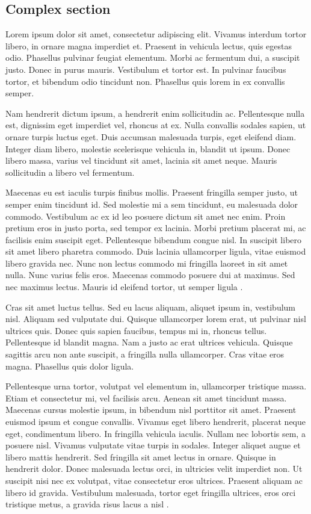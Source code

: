
\subsection{\label{ch:sec:complex-sec}Complex section}


Lorem ipsum dolor sit amet, consectetur adipiscing elit. Vivamus interdum tortor libero, in ornare magna imperdiet et. Praesent in vehicula lectus, quis egestas odio. Phasellus pulvinar feugiat elementum. Morbi ac fermentum dui, a suscipit justo. Donec in purus mauris. Vestibulum et tortor est. In pulvinar faucibus tortor, et bibendum odio tincidunt non. Phasellus quis lorem in ex convallis semper.

Nam hendrerit dictum ipsum, a hendrerit enim sollicitudin ac. Pellentesque nulla est, dignissim eget imperdiet vel, rhoncus at ex. Nulla convallis sodales sapien, ut ornare turpis luctus eget. Duis accumsan malesuada turpis, eget eleifend diam. Integer diam libero, molestie scelerisque vehicula in, blandit ut ipsum. Donec libero massa, varius vel tincidunt sit amet, lacinia sit amet neque. Mauris sollicitudin a libero vel fermentum.

Maecenas eu est iaculis turpis finibus mollis. Praesent fringilla semper justo, ut semper enim tincidunt id. Sed molestie mi a sem tincidunt, eu malesuada dolor commodo. Vestibulum ac ex id leo posuere dictum sit amet nec enim. Proin pretium eros in justo porta, sed tempor ex lacinia. Morbi pretium placerat mi, ac facilisis enim suscipit eget. Pellentesque bibendum congue nisl. In suscipit libero sit amet libero pharetra commodo. Duis lacinia ullamcorper ligula, vitae euismod libero gravida nec. Nunc non lectus commodo mi fringilla laoreet in sit amet nulla. Nunc varius felis eros. Maecenas commodo posuere dui at maximus. Sed nec maximus lectus. Mauris id eleifend tortor, ut semper ligula \cite{Melham2013}.



Cras sit amet luctus tellus. Sed eu lacus aliquam, aliquet ipsum in, vestibulum nisl. Aliquam sed vulputate dui. Quisque ullamcorper lorem erat, ut pulvinar nisl ultrices quis. Donec quis sapien faucibus, tempus mi in, rhoncus tellus. Pellentesque id blandit magna. Nam a justo ac erat ultrices vehicula. Quisque sagittis arcu non ante suscipit, a fringilla nulla ullamcorper. Cras vitae eros magna. Phasellus quis dolor ligula.

Pellentesque urna tortor, volutpat vel elementum in, ullamcorper tristique massa. Etiam et consectetur mi, vel facilisis arcu. Aenean sit amet tincidunt massa. Maecenas cursus molestie ipsum, in bibendum nisl porttitor sit amet. Praesent euismod ipsum et congue convallis. Vivamus eget libero hendrerit, placerat neque eget, condimentum libero. In fringilla vehicula iaculis. Nullam nec lobortis sem, a posuere nisl. Vivamus vulputate vitae turpis in sodales. Integer aliquet augue et libero mattis hendrerit. Sed fringilla sit amet lectus in ornare. Quisque in hendrerit dolor. Donec malesuada lectus orci, in ultricies velit imperdiet non. Ut suscipit nisi nec ex volutpat, vitae consectetur eros ultrices. Praesent aliquam ac libero id gravida. Vestibulum malesuada, tortor eget fringilla ultrices, eros orci tristique metus, a gravida risus lacus a nisl \cite{Melham2013}. 

